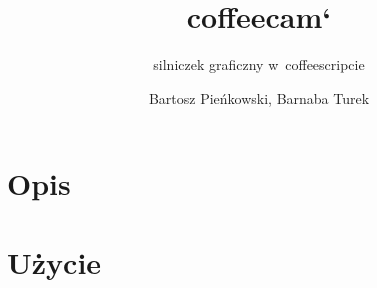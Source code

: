\documentclass[a4paper]{scrartcl}
\begin{document}
\sloppy

\title{coffeecam`}
\subtitle{silniczek graficzny w~coffeescripcie}
\author{Bartosz Pieńkowski, Barnaba Turek}
\maketitle
\section{Opis}
\section{Użycie}
\end{document}
